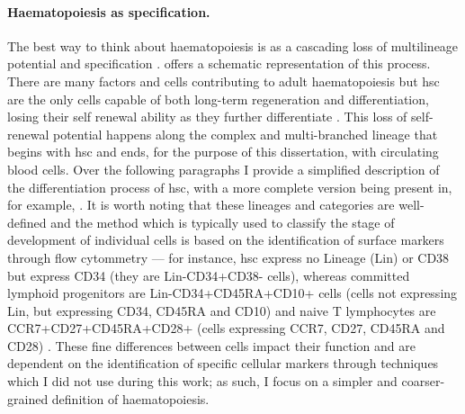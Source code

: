 \paragraph{Haematopoiesis as specification.} The best way to think about haematopoiesis is as a cascading loss of multilineage potential and specification \cite{Rieger2012-bh}.  offers a schematic representation of this process. There are many factors and cells contributing to adult haematopoiesis but \ac{hsc} are the only cells capable of both long-term regeneration and differentiation, losing their self renewal ability as they further differentiate \cite{Rieger2012-bh,Benveniste2010-au}. This loss of self-renewal potential happens along the complex and multi-branched lineage that begins with \ac{hsc} and ends, for the purpose of this dissertation, with circulating blood cells. Over the following paragraphs I provide a simplified description of the differentiation process of \ac{hsc}, with a more complete version being present in, for example, \cite{Rieger2012-bh}. It is worth noting that these lineages and categories are well-defined and the method which is typically used to classify the stage of development of individual cells is based on the identification of surface markers through flow cytommetry \cite{Spangrude1988-xs,Ng2017-cp} --- for instance, \ac{hsc} express no Lineage (Lin) or CD38 but express CD34 (they are Lin-CD34+CD38- cells), whereas committed lymphoid progenitors are Lin-CD34+CD45RA+CD10+ cells (cells not expressing Lin, but expressing CD34, CD45RA and CD10) and naive T lymphocytes are CCR7+CD27+CD45RA+CD28+ (cells expressing CCR7, CD27, CD45RA and CD28) \cite{Miller1999-en,Appay2008-sk}. These fine differences between cells impact their function and are dependent on the identification of specific cellular markers through techniques which I did not use during this work; as such, I focus on a simpler and coarser-grained definition of haematopoiesis.

\begin{figure}[!hb]
    \label{fig:haema}
  \end{figure}

